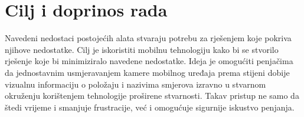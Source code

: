 \section{Cilj i doprinos rada}

Navedeni nedostaci postojećih alata stvaraju potrebu za rješenjem koje pokriva njihove nedostatke. Cilj je iskoristiti mobilnu tehnologiju kako bi se stvorilo rješenje koje bi minimiziralo navedene nedostatke. Ideja je omogućiti penjačima da jednostavnim usmjeravanjem kamere mobilnog uređaja prema stijeni dobije vizualnu informaciju o položaju i nazivima smjerova izravno u stvarnom okruženju korištenjem tehnologije proširene stvarnosti. Takav pristup ne samo da štedi vrijeme i smanjuje frustracije, već i omogućuje sigurnije iskustvo penjanja. 